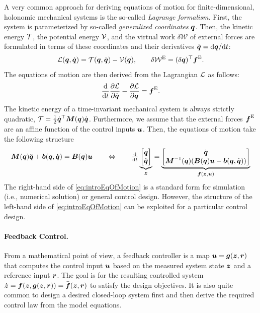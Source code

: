 A very common approach for deriving equations of motion for finite-dimensional, holonomic mechanical systems is the so-called \textit{Lagrange formalism}.
First, the system is parameterized by so-called \textit{generalized coordinates} $\genCoord$.
Then, the kinetic energy $\kineticEnergy$, the potential energy $\potentialEnergy$, and the virtual work $\delta \mathcal{W}$ of external forces are formulated in terms of these coordinates and their derivatives $\genCoordd = \sfrac{\d \genCoord}{\d t}$:
\begin{align}
 \Lagrangian(\genCoord, \genCoordd) = \kineticEnergy(\genCoord, \genCoordd) - \potentialEnergy(\genCoord),
\qquad
 \delta\mathcal{W}^{\text{E}} = (\delta\genCoord)^\top \genForceEx.
\end{align}
The equations of motion are then derived from the Lagrangian $\Lagrangian$ as follows:
\begin{align}\label{eq:LagrangeEq}
 \diff{t} \pdiff[\Lagrangian]{\genCoordd} - \pdiff[\Lagrangian]{\genCoord} = \genForceEx.
\end{align}
The kinetic energy of a time-invariant mechanical system is always strictly quadratic, $\kineticEnergy = \tfrac{1}{2} \genCoordd^\top \sysInertiaMat(\genCoord)\genCoordd$.
Furthermore, we assume that the external forces $\genForceEx$ are an affine function of the control inputs $\sysInput$.
Then, the equations of motion take the following structure
\begin{align}\label{eq:introEqOfMotion}
 \sysInertiaMat(\genCoord)\genCoorddd + \sysForce(\genCoord,\genCoordd) = \sysInputMat(\genCoord) \sysInput
\qquad \Leftrightarrow \qquad
 \tdiff{t} \underbrace{\begin{bmatrix} \genCoord \\ \genCoordd \end{bmatrix}}_{\sysState}
 = \underbrace{\begin{bmatrix} \genCoordd \\ \sysInertiaMat^{-1}(\genCoord)(\sysInputMat(\genCoord) \sysInput - \sysForce(\genCoord,\genCoordd)) \end{bmatrix}}_{\tuple{f}(\sysState,\sysInput)}
\end{align}
The right-hand side of \eqref{eq:introEqOfMotion} is a standard form for simulation (i.e., numerical solution) or general control design.
However, the structure of the left-hand side of \eqref{eq:introEqOfMotion} can be exploited for a particular control design.

\paragraph{Feedback Control.}
From a mathematical point of view, a feedback controller is a map $\sysInput = \tuple{g}(\sysState,\tuple{r})$ that computes the control input $\sysInput$ based on the measured system state $\sysState$ and a reference input $\tuple{r}$.
The goal is for the resulting controlled system $\dot{\sysState} = \tuple{f}(\sysState,\tuple{g}(\sysState,\tuple{r})) = \bar{\tuple{f}}(\sysState,\tuple{r})$ to satisfy the design objectives.
It is also quite common to design a desired closed-loop system first and then derive the required control law from the model equations.


